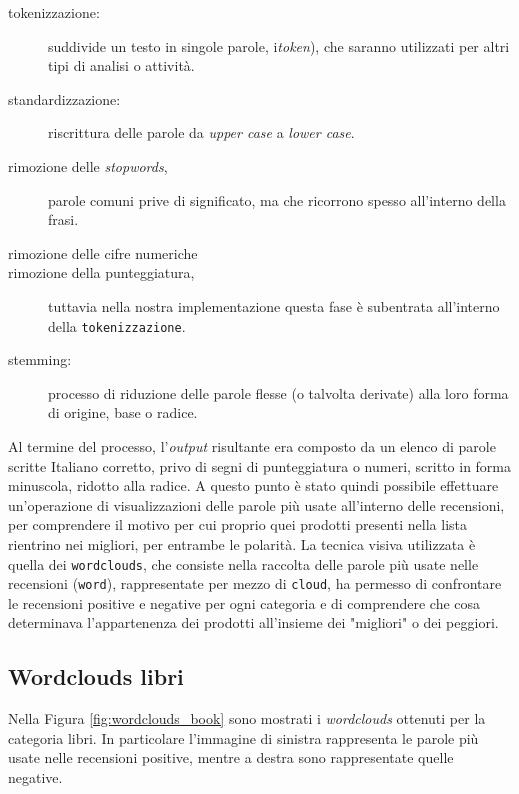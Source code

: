 		\begin{description}
			\item[tokenizzazione:] suddivide un testo in singole parole, i\textit{token}), che saranno utilizzati per altri tipi di analisi o attività.
			\item[standardizzazione:] riscrittura delle parole da \textit{upper case} a \textit{lower case}. 
			\item[rimozione delle \textit{stopwords},] parole comuni prive di significato, ma che ricorrono spesso all'interno della frasi.
			\item[rimozione delle cifre numeriche]
			\item[rimozione della punteggiatura,] tuttavia nella nostra implementazione questa fase è subentrata all'interno della \verb|tokenizzazione|. 
			\item [stemming:] processo di riduzione delle parole flesse (o talvolta derivate) alla loro forma di origine, base o radice.
		\end{description}
			
		Al termine del processo, l'\textit{output} risultante era composto da un elenco di parole scritte Italiano corretto, privo di segni di punteggiatura o numeri, scritto in forma minuscola, ridotto alla radice. A questo punto è stato quindi possibile effettuare un'operazione di visualizzazioni delle parole più usate all'interno delle recensioni, per comprendere il motivo per cui proprio quei prodotti presenti nella lista rientrino nei migliori, per entrambe le polarità. La tecnica visiva utilizzata è quella dei \verb|wordclouds|, che consiste nella raccolta delle parole più usate nelle recensioni (\verb|word|), rappresentate per mezzo di \verb|cloud|, ha permesso di confrontare le recensioni positive e negative per ogni categoria e di comprendere che cosa determinava l'appartenenza dei prodotti all'insieme dei "migliori" o dei peggiori. 
		
		\subsection{Wordclouds libri} 
			Nella Figura \ref{fig:wordclouds_book} sono mostrati i \textit{wordclouds} ottenuti per la categoria libri. In particolare l'immagine di sinistra rappresenta le parole più usate nelle recensioni positive, mentre a destra sono rappresentate quelle negative. 
			
